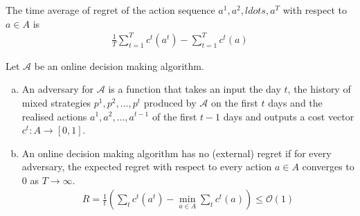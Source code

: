\begin{defn}
The time average of regret of the action sequence $a^1,a^2,ldots,a^T$ with respect to $a\in A$ is 
\begin{align*}
\frac{1}{T}\sum_{t=1}^{T}c^t(a^t)-\sum_{t=1}^{T}c^t(a)
\end{align*}
\end{defn}

\begin{defn}
Let $\mathcal{A}$ be an online decision making algorithm.
\begin{enumerate}[(a)]
\item An adversary for $\mathcal{A}$ is a function that takes an input the day $t$, the history of mixed strategies $p^1,p^2,\ldots,p^t$ produced by $\mathcal{A}$ on the first $t$ days and the realised actions $a^1,a^2,\ldots, a^{t-1}$ of the first $t-1$ days and outputs a cost vector $c^t:A\to [0,1]$.
\item An online decision making algorithm has no (external) regret if for every adversary, the expected regret with respect to every action $a\in A$ converges to $0$ as $T\to \infty$.
\begin{align*}
R=\frac{1}{t}\left(\sum_{t}c^t(a^t)-\min_{a \in A}\sum_{t}c^t(a)\right)\leq \mathcal{O}(1)
\end{align*}
\end{enumerate}
\end{defn}



